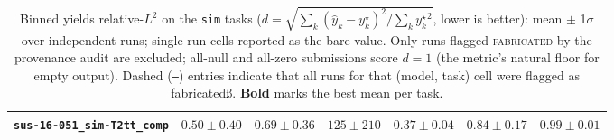 \documentclass{article}
\begin{document}
\begin{table}[t]
{\begin{tabular}{lcccccc}
\texttt{sus-16-051\_sim-T2tt\_comp}                   & $\mathbf{0.50{\pm}0.40}$ & $0.69{\pm}0.36$ & $125{\pm}210$    & $0.37{\pm}0.04$ & $0.84{\pm}0.17$ & $0.99{\pm}0.01$ \\
\bottomrule
\end{tabular}}%
\caption{Binned yields relative-$L^2$ on the \texttt{sim} tasks
($d=\sqrt{\sum_k(\hat{y}_k-y^\star_k)^2/\sum_k {y^\star_k}^2}$, lower
is better): mean $\pm$ 1$\sigma$ over independent runs; single-run
cells reported as the bare value. Only runs flagged \textsc{fabricated}
by the provenance audit are excluded; all-null and all-zero submissions
score $d{=}1$ (the metric's natural floor for empty output).
Dashed (\texttt{--}) entries indicate that all runs for that
(model, task) cell were flagged as fabricatedß. \textbf{Bold} marks the
best mean per task.}
\label{tab:sim_scores}
\end{table}
\end{document}
